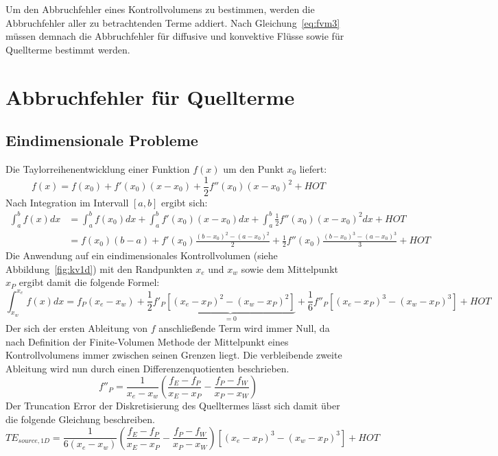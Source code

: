Um den Abbruchfehler eines Kontrollvolumens zu bestimmen, werden die
Abbruchfehler aller zu betrachtenden Terme addiert. Nach Gleichung~\eqref{eq:fvm3}
müssen demnach die Abbruchfehler für diffusive und konvektive Flüsse sowie
für Quellterme bestimmt werden.


\section{Abbruchfehler für Quellterme}
\label{sec:Quellterm}

\subsection{Eindimensionale Probleme}
\label{sec:source1d}
Die Taylorreihenentwicklung einer Funktion $f(x)$ um den Punkt $x_0$
liefert:
\begin{equation*}
  f(x) = f(x_0) + f'(x_0)(x-x_0) + \frac{1}{2} f''(x_0)(x-x_0)^2 + HOT
\end{equation*}
Nach Integration im Intervall $[a, b]$ ergibt sich:
\begin{align*}
  \int_a^b f(x) dx &= \int_a^b f(x_0) dx + \int_a^b f'(x_0)(x-x_0) dx
+ \int_a^b \frac{1}{2} f''(x_0)(x-x_0)^2 dx + HOT\\
&= f(x_0) (b-a) + f'(x_0) \frac{(b-x_0)^2-(a-x_0)^2}{2}
+ \frac{1}{2} f''(x_0) \frac{(b-x_0)^3-(a-x_0)^3}{3} +HOT
\end{align*}
Die Anwendung auf ein eindimensionales Kontrollvolumen (siehe Abbildung~\ref{fig:kv1d}) mit den Randpunkten $x_e$ und
$x_w$ sowie dem Mittelpunkt $x_P$ ergibt damit die folgende Formel:
\begin{equation*}
  \int_{x_w}^{x_e} f(x)dx = f_P(x_e-x_w)
  + \frac{1}{2} f'_P \underbrace{\left[{(x_e-x_P)^2-(x_w-x_P)^2}\right]}_{=0}
+ \frac{1}{6} f''_P \left[{{(x_e-x_P)}^3-{(x_w-x_P)}^3}\right] + HOT
\end{equation*}
Der sich der ersten Ableitung von $f$ anschließende Term wird immer Null, da nach
Definition der Finite-Volumen Methode der Mittelpunkt eines Kontrollvolumens immer
zwischen seinen Grenzen liegt.
Die verbleibende zweite Ableitung wird nun durch einen Differenzenquotienten
beschrieben.
\begin{equation}
  \label{eq:diskretisierung_f''P}
  f''_P = \frac{1}{x_e-x_w}\left(\frac{f_E-f_P}{x_E-x_P}-\frac{f_P-f_W}{x_P-x_W}\right)
\end{equation}
Der Truncation Error der Diskretisierung des Quelltermes lässt sich damit über die
folgende Gleichung beschreiben.
\begin{equation}
  TE_{source,1D} =
\frac{1}{6(x_e-x_w)}\left(\frac{f_E-f_P}{x_E-x_P}-\frac{f_P-f_W}{x_P-x_W}\right)
\left[{{(x_e-x_P)}^3-{(x_w-x_P)}^3}\right] + HOT\label{eq:te_source1}
\end{equation}


